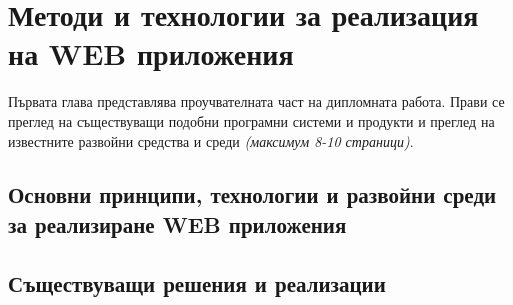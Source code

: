 \chapter{Методи и технологии за реализация на WEB приложения}

Първата глава представлява проучвателната част на дипломната работа. Прави се преглед на съществуващи подобни програмни системи и продукти и преглед на известните развойни средства и среди \emph{(максимум 8-10 страници)}.

\section{Основни принципи, технологии и развойни среди за реализиране WEB приложения}

\section{Съществуващи решения и реализации}
